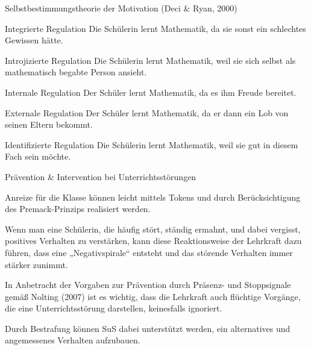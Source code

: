 \begin{mapping}{Selbstbestimmungstheorie der Motivation (Deci \& Ryan, 2000)}
    \begin{answer}
        Integrierte Regulation
        \ismappedto
        Die Schülerin lernt Mathematik, da sie sonst ein schlechtes Gewissen hätte.
    \end{answer}
    \begin{answer}
        Introjizierte Regulation
        \ismappedto
        Die Schülerin lernt Mathematik, weil sie sich selbst als mathematisch begabte Person ansieht.
    \end{answer}
    \begin{answer}
        Internale Regulation
        \ismappedto
        Der Schüler lernt Mathematik, da es ihm Freude bereitet.
    \end{answer}
    \begin{answer}
        Externale Regulation
        \ismappedto
        Der Schüler lernt Mathematik, da er dann ein Lob von seinen Eltern bekommt.
    \end{answer}
    \begin{answer}
        Identifizierte Regulation
        \ismappedto
        Die Schülerin lernt Mathematik, weil sie gut in diesem Fach sein möchte.
    \end{answer}
\end{mapping}

\begin{multiple-choice}{Prävention \& Intervention bei Unterrichtsstörungen}
    \begin{answers}
        \item[\correct] Anreize für die Klasse können leicht mittels Tokens und durch Berücksichtigung des Premack-Prinzips realisiert werden.
        \item[\correct] Wenn man eine Schülerin, die häufig stört, ständig ermahnt, und dabei vergisst, positives Verhalten zu verstärken, kann diese Reaktionsweise der Lehrkraft dazu führen, dass eine „Negativspirale“ entsteht und das störende Verhalten immer stärker zunimmt.
        \item[\correct] In Anbetracht der Vorgaben zur Prävention durch Präsenz- und Stoppsignale gemäß Nolting (2007) ist es wichtig, dass die Lehrkraft auch flüchtige Vorgänge, die eine Unterrichtsstörung darstellen, keinesfalls ignoriert.
        \item[\wrong] Durch Bestrafung können SuS dabei unterstützt werden, ein alternatives und angemessenes Verhalten aufzubauen.
    \end{answers}
\end{multiple-choice}

